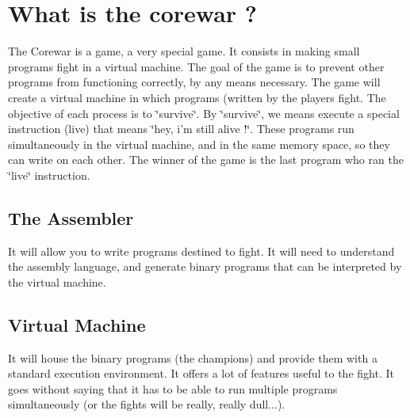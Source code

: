 \hypertarget{index_intro_sec}{}\section{What is the corewar ?}\label{index_intro_sec}
The Corewar is a game, a very special game. It consists in making small programs fight in a virtual machine. The goal of the game is to prevent other programs from functioning correctly, by any means necessary. The game will create a virtual machine in which programs (written by the players fight. The objective of each process is to \char`\"{}survive\char`\"{}. By \char`\"{}survive\char`\"{}, we means execute a special instruction (live) that means \char`\"{}hey, i’m still alive !\char`\"{}. These programs run simultaneously in the virtual machine, and in the same memory space, so they can write on each other. The winner of the game is the last program who ran the \char`\"{}live\char`\"{} instruction.

\hypertarget{index_r}{}\subsection{The Assembler}\label{index_r}
It will allow you to write programs destined to fight. It will need to understand the assembly language, and generate binary programs that can be interpreted by the virtual machine.\hypertarget{index_The}{}\subsection{Virtual Machine}\label{index_The}
It will house the binary programs (the champions) and provide them with a standard execution environment. It offers a lot of features useful to the fight. It goes without saying that it has to be able to run multiple programs simultaneously (or the fights will be really, really dull...). 